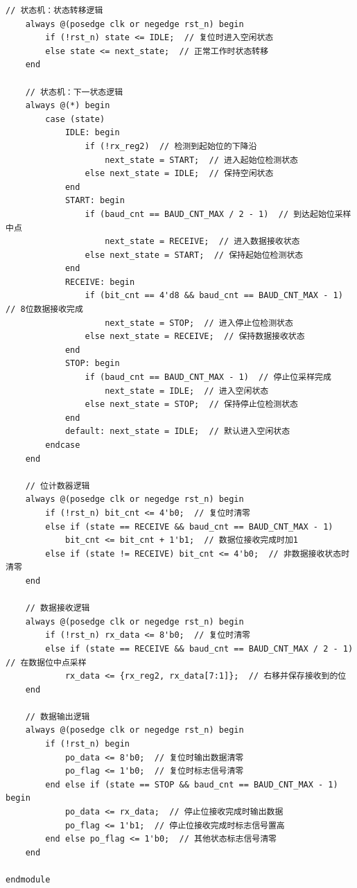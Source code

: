 \documentclass[a4paper,10pt]{article}
\begin{document}
\begin{lstlisting}[caption=uart_rx.v]
    // 状态机：状态转移逻辑
    always @(posedge clk or negedge rst_n) begin
        if (!rst_n) state <= IDLE;  // 复位时进入空闲状态
        else state <= next_state;  // 正常工作时状态转移
    end

    // 状态机：下一状态逻辑
    always @(*) begin
        case (state)
            IDLE: begin
                if (!rx_reg2)  // 检测到起始位的下降沿
                    next_state = START;  // 进入起始位检测状态
                else next_state = IDLE;  // 保持空闲状态
            end
            START: begin
                if (baud_cnt == BAUD_CNT_MAX / 2 - 1)  // 到达起始位采样中点
                    next_state = RECEIVE;  // 进入数据接收状态
                else next_state = START;  // 保持起始位检测状态
            end
            RECEIVE: begin
                if (bit_cnt == 4'd8 && baud_cnt == BAUD_CNT_MAX - 1)  // 8位数据接收完成
                    next_state = STOP;  // 进入停止位检测状态
                else next_state = RECEIVE;  // 保持数据接收状态
            end
            STOP: begin
                if (baud_cnt == BAUD_CNT_MAX - 1)  // 停止位采样完成
                    next_state = IDLE;  // 进入空闲状态
                else next_state = STOP;  // 保持停止位检测状态
            end
            default: next_state = IDLE;  // 默认进入空闲状态
        endcase
    end

    // 位计数器逻辑
    always @(posedge clk or negedge rst_n) begin
        if (!rst_n) bit_cnt <= 4'b0;  // 复位时清零
        else if (state == RECEIVE && baud_cnt == BAUD_CNT_MAX - 1)
            bit_cnt <= bit_cnt + 1'b1;  // 数据位接收完成时加1
        else if (state != RECEIVE) bit_cnt <= 4'b0;  // 非数据接收状态时清零
    end

    // 数据接收逻辑
    always @(posedge clk or negedge rst_n) begin
        if (!rst_n) rx_data <= 8'b0;  // 复位时清零
        else if (state == RECEIVE && baud_cnt == BAUD_CNT_MAX / 2 - 1)  // 在数据位中点采样
            rx_data <= {rx_reg2, rx_data[7:1]};  // 右移并保存接收到的位
    end

    // 数据输出逻辑
    always @(posedge clk or negedge rst_n) begin
        if (!rst_n) begin
            po_data <= 8'b0;  // 复位时输出数据清零
            po_flag <= 1'b0;  // 复位时标志信号清零
        end else if (state == STOP && baud_cnt == BAUD_CNT_MAX - 1) begin
            po_data <= rx_data;  // 停止位接收完成时输出数据
            po_flag <= 1'b1;  // 停止位接收完成时标志信号置高
        end else po_flag <= 1'b0;  // 其他状态标志信号清零
    end

endmodule

\end{lstlisting}
\end{document}
